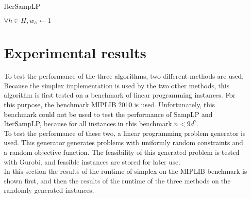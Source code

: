 \documentclass[nocopyrightspace]{acm_proc_article-sp}
\begin{document}

\begin{algorithm}[h]
\label{alg:itersamplp}
\caption{IterSampLP}
$\forall h \in H, w_h \gets 1$ \;
\end{algorithm}

\section{Experimental results}
To test the performance of the three algorithms, two different methods are used. Because the simplex implementation is used by the two other methods, this algorithm is first tested  on a benchmark of linear programming instances. For this purpose, the benchmark MIPLIB 2010 \cite{KochEtAl2011} is used. Unfortunately, this benchmark could not be used to test the performance of SampLP and IterSampLP, because for all instances in this benchmark $n < 9d^2$. \\
To test the performance of these two, a linear programming problem generator is used. This generator generates problems with uniformly random constraints and a random objective function. The feasibility of this generated problem is tested with Gurobi, and feasible instances are stored for later use. \\
In this section the results of the runtime of simplex on the MIPLIB benchmark is shown first, and then the results of the runtime of the three methods on the randomly generated instances.
\end{document}
